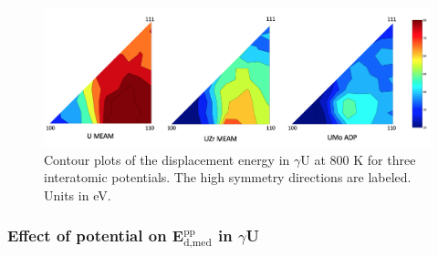 \documentclass[review]{elsarticle}
\begin{document}
\begin{figure}[h]
 \centering
 \includegraphics[width=\textwidth]{800K_contour.png} 
 \caption{Contour plots of the displacement energy in $\gamma$U at 800 K for three interatomic potentials. The high symmetry directions are labeled. Units in eV.}
 \label{fig:800Kcontour}
\end{figure}

\FloatBarrier

\subsubsection{Effect of potential on E$^{\textrm{pp}}_{\textrm{d,med}}$ in $\gamma$U}
\end{document}
